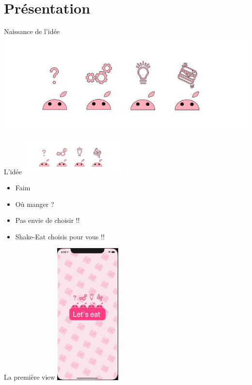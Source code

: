 \section{Présentation}
    
    \frame{\sectionpage}
     \begin{frame}{Naissance de l'idée}
        \centering
            \includegraphics[height = 0.6 \textheight]{images/shake-eat-separate-reflexion.png}
        
    \end{frame}
    
    \begin{frame}{L'idée}
       \centering
        \includegraphics[width = 0.40\textwidth]{images/shake-eat-separate-reflexion.png}
        \begin{itemize}
            \item Faim
            \item Où manger ?
            \item Pas envie de choisir !!
            \item Shake-Eat choisis pour vous !!
        \end{itemize}
    \end{frame}
    
    \begin{frame}{La première view}
       \centering
        \includegraphics[width = 0.25\textwidth]{images/premiere-view.png}
    \end{frame}
    

